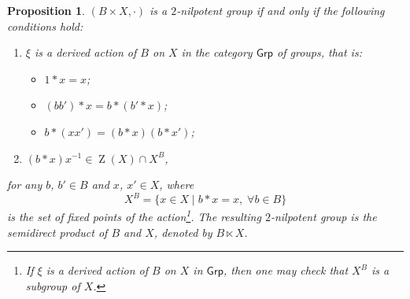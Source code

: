 \documentclass[10pt,a4paper]{amsart}
\newtheorem{proposition}{Proposition}
\newcommand{\Grp}{\ensuremath{\mathsf{Grp}}}
\DeclareMathOperator{\bZ}{Z}
\begin{document}
\begin{proposition}\label{PropAct}
    \((B \times X,\cdot)\) is a \(2\)-nilpotent group if and only if the following conditions hold:
    \begin{enumerate}
        \item \(\xi\) is a derived action of \(B\) on \(X\) in the category \(\Grp\) of groups, that is:
              \begin{itemize}
                  \item[(i)] \(1 \ast x = x\);
                  \item[(ii)] \((bb') \ast x = b \ast (b' \ast x)\);
                  \item[(iii)] \(b \ast (xx') = (b \ast x)(b \ast x')\);
              \end{itemize}

        \item \((b \ast x)x^{-1} \in \bZ(X)\cap X^B\),
    \end{enumerate}
    for any \(b\), \(b' \in B\) and \(x\), \(x' \in X\), where
    \[
        X^B=\{x \in X \mid b\ast x=x, \; \forall b\in B\}
    \]
    is the set of fixed points of the action\footnote{If \(\xi\) is a derived action of \(B\) on \(X\) in \(\Grp\), then one may check that \(X^B\) is a subgroup of \(X\).}. The resulting \(2\)-nilpotent group is the \emph{semidirect product} of \(B\) and \(X\), denoted by \(B \ltimes X\).
\end{proposition}
\end{document}
